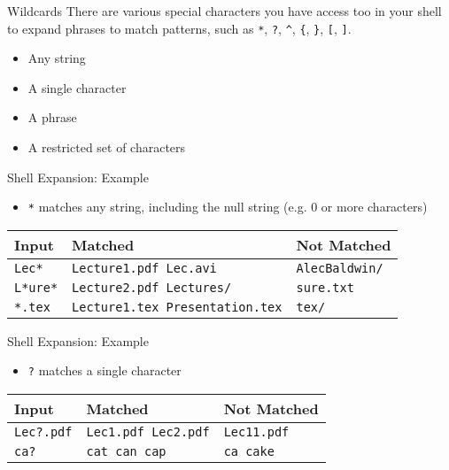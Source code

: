 \begin{frame}[fragile]{Wildcards}
  There are various special characters you have access too in your shell to expand phrases to match patterns,
  such as \texttt{*}, \texttt{?}, \texttt{\^{}}, \texttt{\{}, \texttt{\}}, \texttt{[}, \texttt{]}.
  \begin{itemize}[<+- | alert@+>]
    \item Any string
    \item A single character
    \item A phrase
    \item A restricted set of characters
  \end{itemize}
\end{frame}

\begin{frame}[fragile]{Shell Expansion: Example}
  \begin{itemize}
    \item \texttt{*} matches any string, including the null string (e.g. 0 or more characters)
  \end{itemize}
  \begin{center}
    {\small
    \begin{tabular}{|l|l|l|}
      \hline
      Input & Matched & Not Matched\\ \hline
      \texttt{Lec*} & \texttt{Lecture1.pdf Lec.avi} & \texttt{AlecBaldwin/}\\ \hline
      \texttt{L*ure*} & \texttt{Lecture2.pdf Lectures/} & \texttt{sure.txt}\\ \hline
      \texttt{*.tex} & \texttt{Lecture1.tex Presentation.tex} & \texttt{tex/}\\ \hline
    \end{tabular}
    }
  \end{center}
\end{frame}

\begin{frame}[fragile]{Shell Expansion: Example}
  \begin{itemize}
    \item \texttt{?} matches a single character
  \end{itemize}
  \begin{center}
    {\small
    \begin{tabular}{|l|l|l|}
      \hline
      Input & Matched & Not Matched\\ \hline
      \texttt{Lec?.pdf} & \texttt{Lec1.pdf Lec2.pdf} & \texttt{Lec11.pdf}\\ \hline
      \texttt{ca?} & \texttt{cat can cap} & \texttt{ca cake}\\ \hline
    \end{tabular}
    }
  \end{center}
\end{frame}

